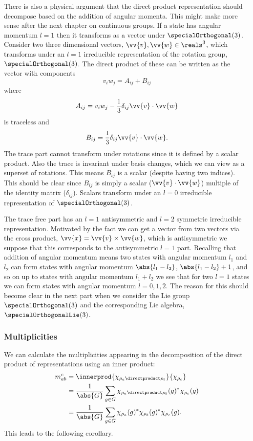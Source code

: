 There is also a physical argument that the direct product representation
should decompose based on the addition of angular momenta.
This might make more sense after the next chapter on continuous groups.
If a state has angular momentum \(l = 1\) then it transforms as a vector
under \(\specialOrthogonal(3)\).
Consider two three dimensional vectors, \(\vv{v}, \vv{w} \in \reals^3\),
which transforms under an \(l = 1\) irreducible representation of the rotation
group, \(\specialOrthogonal(3)\).
The direct product of these can be written as the vector with components
\begin{equation}
    v_iw_j = A_{ij} + B_{ij}
\end{equation}
where
\begin{equation}
    A_{ij} = v_iw_j - \frac{1}{3}\delta_{ij} \vv{v}\cdot \vv{w}
\end{equation}
is traceless and
\begin{equation}
    B_{ij} = \frac{1}{3}\delta_{ij} \vv{v}\cdot\vv{w}.
\end{equation}
The trace part cannot transform under rotations since it is defined by a
scalar product.
Also the trace is invariant under basis changes, which we can view as a
superset of rotations.
This means \(B_{ij}\) is a scalar (despite having two indices).
This should be clear since \(B_{ij}\) is simply a scalar
(\(\vv{v}\cdot\vv{w}\)) multiple of the identity matrix (\(\delta_{ij}\)).
Scalars transform under an \(l = 0\) irreducible representation of
\(\specialOrthogonal(3)\).

The trace free part has an \(l = 1\) antisymmetric and \(l = 2\) symmetric
irreducible representation.
Motivated by the fact we can get a vector from two vectors via the cross
product, \(\vv{x} = \vv{v} \times \vv{w}\), which is antisymmetric we suppose
that this corresponds to the antisymmetric \(l = 1\) part.
Recalling that addition of angular momentum means two states with angular
momentum \(l_1\) and \(l_2\) can form states with angular momentum \(\abs{l_1 -
    l_2}\), \(\abs{l_1 - l_2} + 1\), and so on up to states with angular momentum
\(l_1 + l_2\) we see that for two \(l = 1\) states we can form states with
angular momentum \(l = 0, 1, 2\).
The reason for this should become clear in the next part when we consider
the Lie group \(\specialOrthogonal(3)\) and the corresponding Lie algebra,
\(\specialOrthogonalLie(3)\).

\subsubsection{Multiplicities}
We can calculate the multiplicities appearing in the decomposition of the
direct product of representations using an inner product:
\begin{align}
    m_{ab}^c &= \innerprod{\chi_{\rho_a \directproduct
            \rho_b}}{\chi_{\rho_c}}\\
    &= \frac{1}{\abs{G}} \sum_{g \in G} \chi_{\rho_{a} \directproduct
        \rho_{b}}(g)^* \chi_{\rho_c}(g)\\
    &= \frac{1}{\abs{G}} \sum_{g \in G} \chi_{\rho_a}(g)^*
    \chi_{\rho_b}(g)^* \chi_{\rho_c}(g).
\end{align}
This leads to the following corollary.

